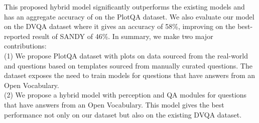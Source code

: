 \documentclass[10pt,twocolumn,letterpaper]{article}
\begin{document}
This proposed hybrid model significantly outperforms the existing models and has an aggregate accuracy of  on the PlotQA dataset.
We also evaluate our model on the DVQA dataset where it gives an accuracy of 58\%, improving on the best-reported result of SANDY \cite{DVQA} of 46\%.
In summary, we make two major contributions:\\
(1) We propose PlotQA dataset with plots on data sourced from the real-world and questions based on templates sourced from manually curated questions.
The dataset exposes the need to train models for questions that have answers from an Open Vocabulary. \\
(2) We propose a hybrid model with perception and QA modules for questions that have answers from an Open Vocabulary. This model gives the best performance not only on our dataset but also on the existing DVQA dataset.
\end{document}
